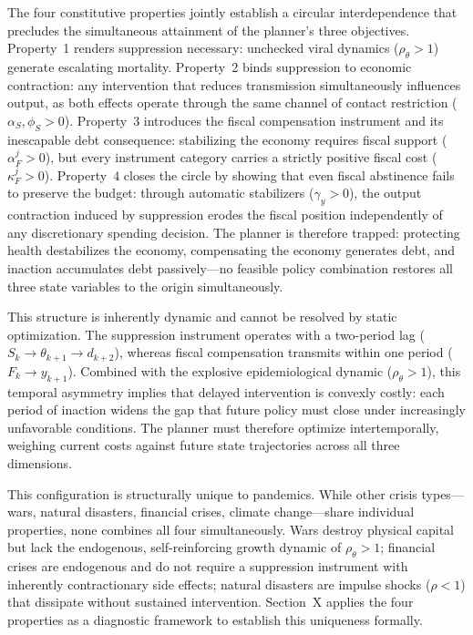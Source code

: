 The four constitutive properties jointly establish a circular interdependence that precludes the simultaneous attainment of the planner's three objectives. Property~1 renders suppression necessary: unchecked viral dynamics ($\rho_\theta > 1$) generate escalating mortality. Property~2 binds suppression to economic contraction: any intervention that reduces transmission simultaneously influences output, as both effects operate through the same channel of contact restriction ($\alpha_S, \phi_S > 0$). Property~3 introduces the fiscal compensation instrument and its inescapable debt consequence: stabilizing the economy requires fiscal support ($\alpha_F^j > 0$), but every instrument category carries a strictly positive fiscal cost ($\kappa_F^j > 0$). Property~4 closes the circle by showing that even fiscal abstinence fails to preserve the budget: through automatic stabilizers ($\gamma_y > 0$), the output contraction induced by suppression erodes the fiscal position independently of any discretionary spending decision. The planner is therefore trapped: protecting health destabilizes the economy, compensating the economy generates debt, and inaction accumulates debt passively---no feasible policy combination restores all three state variables to the origin simultaneously.

This structure is inherently dynamic and cannot be resolved by static optimization. The suppression instrument operates with a two-period lag ($S_k \to \theta_{k+1} \to d_{k+2}$), whereas fiscal compensation transmits within one period ($F_k \to y_{k+1}$). Combined with the explosive epidemiological dynamic ($\rho_\theta > 1$), this temporal asymmetry implies that delayed intervention is convexly costly: each period of inaction widens the gap that future policy must close under increasingly unfavorable conditions. The planner must therefore optimize intertemporally, weighing current costs against future state trajectories across all three dimensions.

This configuration is structurally unique to pandemics. While other crisis types---wars, natural disasters, financial crises, climate change---share individual properties, none combines all four simultaneously. Wars destroy physical capital but lack the endogenous, self-reinforcing growth dynamic of $\rho_\theta > 1$; financial crises are endogenous and do not require a suppression instrument with inherently contractionary side effects; natural disasters are impulse shocks ($\rho < 1$) that dissipate without sustained intervention. Section~X applies the four properties as a diagnostic framework to establish this uniqueness formally.


